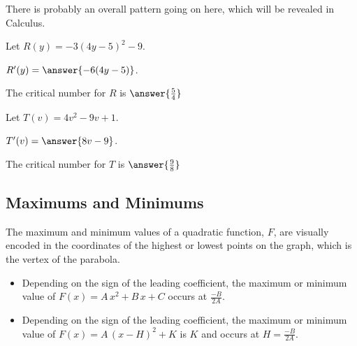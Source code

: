 \documentclass{ximera}
\begin{document}
There is probably an overall pattern going on here, which will be revealed in Calculus. 








\begin{question}  


Let $R(y) = -3 (4 y - 5)^2 - 9$.

$R'(y) = \answer{-6(4y-5)}$.

The critical number for $R$ is $\answer{\frac{5}{4}}$

\end{question}








\begin{question}  


Let $T(v) = 4 v^2 - 9 v + 1$.

$T'(v) = \answer{8v-9}$.

The critical number for $T$ is $\answer{\frac{9}{8}}$

\end{question}






































\subsection*{Maximums and Minimums}




The maximum and minimum values of a quadratic function, $F$, are visually encoded in the coordinates of the highest or lowest points on the  graph, which is the vertex of the parabola.


\begin{itemize}
     \item Depending on the sign of the leading coefficient, the maximum or minimum value of $F(x) = A \, x^2 + B \, x + C$ occurs at $\frac{-B}{2A}$. 


     \item Depending on the sign of the leading coefficient, the maximum or minimum value of $F(x) = A \, (x - H)^2 + K$ is $K$ and occurs at $H = \frac{-B}{2A}$. 
\end{itemize}
\end{document}
